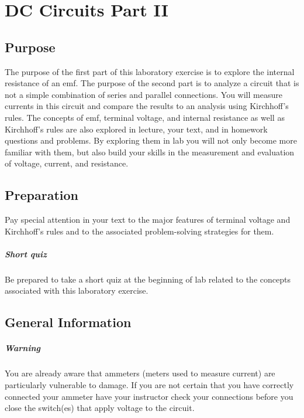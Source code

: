 \chapter {DC Circuits Part II}

\begin{multicols}{2}
\section {Purpose}  
The purpose of the first part of this laboratory exercise is to explore the internal resistance of an emf.  The purpose of the second part is to analyze a circuit that is not a simple combination of series and parallel connections.  You will measure currents in this circuit and compare the results to an analysis using Kirchhoff's rules.  The concepts of emf, terminal voltage, and internal resistance as well as Kirchhoff's rules are also explored in lecture, your text, and in homework questions and problems.  By exploring them in lab you will not only become more familiar with them, but also build your skills in the measurement and evaluation of voltage, current, and resistance.

\section {Preparation} Pay special attention in your text to the major features of terminal voltage and Kirchhoff's rules and to the associated problem-solving strategies for them.

\paragraph {Short quiz}  Be prepared to take a short quiz at the beginning of lab related to the concepts associated with this laboratory exercise.

\section {General Information}
\paragraph {Warning}  You are already aware that ammeters (meters used to measure current) are particularly vulnerable to damage.  If you are not certain that you have correctly connected your ammeter have your instructor check your connections before you close the switch(es) that apply voltage to the circuit.


\end{multicols}
